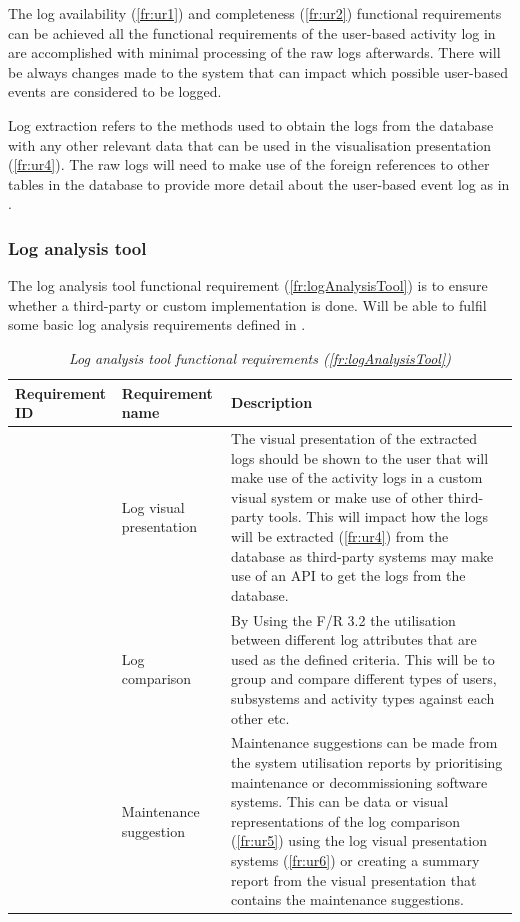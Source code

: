 The log availability (\ref{fr:ur1}) and completeness (\ref{fr:ur2}) functional requirements can be achieved all the functional requirements of the user-based activity log in  are accomplished with minimal processing of the raw logs afterwards. There will be always changes made to the system that can impact which possible user-based events are considered to be logged.\par Log extraction refers to the methods used to obtain the logs from the database with any other relevant data that can be used in the visualisation presentation (\ref{fr:ur4}). The raw logs will need to make use of the foreign references to other tables in the database to provide more detail about the user-based event log as in .

\subsubsection{Log analysis tool}
The log analysis tool functional requirement (\ref{fr:logAnalysisTool}) is to ensure whether a third-party or custom implementation is done. Will be able to fulfil some basic log analysis requirements defined in .

\begin{table}[!htb]
	\centering
	\small
	\caption[Log analysis tool functional requirements (\ref{fr:logAnalysisTool})]
	{\textit{Log analysis tool functional requirements (\ref{fr:logAnalysisTool})}}
	\label{tbl:ch2_logAnalysisToolFR}
	\begin{tabularx}{\textwidth}{|l|l|X|}
		\hline \textbf{Requirement ID} & \textbf{Requirement name} & \textbf{Description} \\
		\hline \subsubphase{fr:ur4} & Log visual presentation & The visual presentation of the extracted logs should be shown to the user that will make use of the activity logs in a custom visual system or make use of other third-party tools. This will impact how the logs will be extracted (\ref{fr:ur4}) from the database as third-party systems may make use of an API to get the logs from the database. \\
		\hline \subsubphase{fr:ur5} & Log comparison & \RaggedRight By Using the F/R 3.2 the utilisation between different log attributes that are used as the defined criteria. This will be to group and compare different types of users, subsystems and activity types against each other etc.\\
		\hline \subsubphase{fr:ur6} & \RaggedRight Maintenance suggestion & Maintenance suggestions can be made from the system utilisation reports by prioritising maintenance or decommissioning software systems. This can be data or visual representations of the log comparison (\ref{fr:ur5}) using the log visual presentation systems (\ref{fr:ur6}) or creating a summary report from the visual presentation that contains the maintenance suggestions. \\
		\hline
	\end{tabularx}
\end{table}

